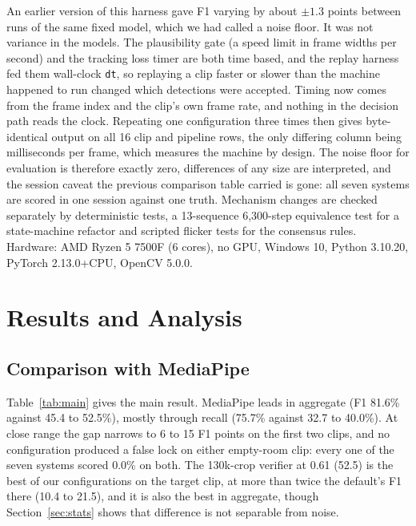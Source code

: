 \documentclass[conference,a4paper]{IEEEtran}
\begin{document}
An earlier version of this harness gave F1 varying by about $\pm1.3$ points
between runs of the same fixed model, which we had called a noise floor. It
was not variance in the models. The plausibility gate (a speed limit in
frame widths per second) and the tracking loss timer are both time based,
and the replay harness fed them wall-clock \texttt{dt}, so replaying a clip
faster or slower than the machine happened to run changed which detections
were accepted. Timing now comes from the frame index and the clip's own
frame rate, and nothing in the decision path reads the clock. Repeating one
configuration three times then gives byte-identical output on all 16 clip
and pipeline rows, the only differing column being milliseconds per frame,
which measures the machine by design. The noise floor for evaluation is
therefore exactly zero, differences of any size are interpreted, and the
session caveat the previous comparison table carried is gone: all seven
systems are scored in one session against one truth. Mechanism changes are
checked separately by deterministic tests, a 13-sequence 6,300-step
equivalence test for a state-machine refactor and scripted flicker tests for
the consensus rules. Hardware: AMD Ryzen 5 7500F (6 cores), no GPU, Windows
10, Python 3.10.20, PyTorch 2.13.0+CPU, OpenCV 5.0.0.

\section{Results and Analysis}
\label{sec:results}

\subsection{Comparison with MediaPipe}
Table~\ref{tab:main} gives the main result. MediaPipe leads in aggregate
(F1 81.6\% against 45.4 to 52.5\%), mostly through recall (75.7\% against
32.7 to 40.0\%). At close range the gap narrows to 6 to 15 F1 points on the
first two clips, and no configuration produced a false lock on either
empty-room clip: every one of the seven systems scored 0.0\% on both. The
130k-crop verifier at 0.61 (52.5) is the best of our configurations on the
target clip, at more than twice the default's F1 there (10.4 to 21.5), and
it is also the best in aggregate, though Section~\ref{sec:stats} shows that
difference is not separable from noise.
\end{document}

